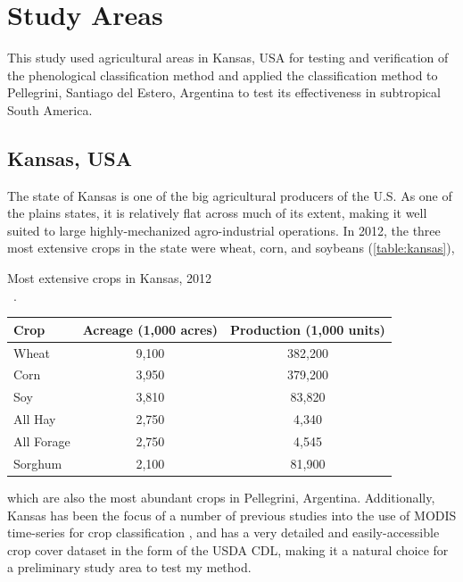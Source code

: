 \chapter{Study Areas}
\label{chapter:studyareas}

This study used agricultural areas in Kansas, USA for testing and verification of the phenological classification method and applied the classification method to Pellegrini, Santiago del Estero, Argentina to test its effectiveness in subtropical South America.


\section{Kansas, USA}
\label{chapter:studyareas:kansas}

The state of Kansas is one of the big agricultural producers of the U.S. As one of the plains states, it is relatively flat across much of its extent, making it well suited to large highly-mechanized agro-industrial operations. In 2012, the three most extensive crops in the state were wheat, corn, and soybeans (\autoref{table:kansas}),
\begin{sstable}
  \centering
  \caption[Most extensive crops in Kansas, 2012.]{Most extensive crops in Kansas, 2012\\~\autocite[adapted from][]{usda2013kansascrops}.}
  \label{table:kansas}
  \begin{tabu}{lcc}
    \toprule
    \textbf{Crop} & \textbf{Acreage (1,000 acres)} & \textbf{Production (1,000 units)} \\
    \midrule
    Wheat & 9,100 & 382,200 \\
    Corn & 3,950 & 379,200 \\
    Soy & 3,810 & 83,820 \\
    All Hay & 2,750 & 4,340 \\
    All Forage & 2,750 & 4,545 \\
    Sorghum & 2,100 & 81,900 \\      
    \bottomrule
  \end{tabu}
\end{sstable}
which are also the most abundant crops in Pellegrini, Argentina. Additionally, Kansas has been the focus of a number of previous studies into the use of MODIS time-series for crop classification \autocites{wardlow2002discriminating}{wardlow2005state-level}{wardlow2007analysis}{wardlow2008large-area}, and has a very detailed and easily-accessible crop cover dataset in the form of the USDA CDL, making it a natural choice for a preliminary study area to test my method.

